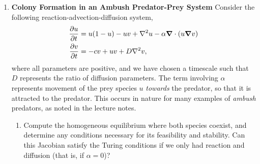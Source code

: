 \documentclass[a4paper,12pt]{article}
\begin{document}
\begin{enumerate}
\begin{enumerate}
{    }
\end{enumerate}
\item{
\textbf{Colony Formation in an Ambush Predator-Prey System} \quad 
Consider the following reaction-advection-diffusion system,
\begin{equation}
\begin{aligned}\label{ambush_model}
    \pd{u}{t} &= u(1-u)-uv + \nabla^2{u} - \alpha \vnabla \cdot \left(u\vnabla v \right) \\
    \pd{v}{t} &= -cv+uv +  D\nabla^2v,
    \end{aligned}
\end{equation}
where all parameters are positive, and we have chosen a timescale such that $D$ represents the ratio of diffusion parameters. The term involving $\alpha$ represents movement of the prey species $u$ \emph{towards} the predator, so that it is attracted to the predator. This occurs in nature for many examples of \emph{ambush} predators, as noted in the lecture notes.

\begin{enumerate}
    \item Compute the homogeneous equilibrium where both species coexist, and determine any conditions necessary for its feasibility and stability. Can this Jacobian satisfy the Turing conditions if we only had reaction and diffusion (that is, if $\alpha=0$)?
\end{enumerate}}
\end{enumerate}
\end{document}
